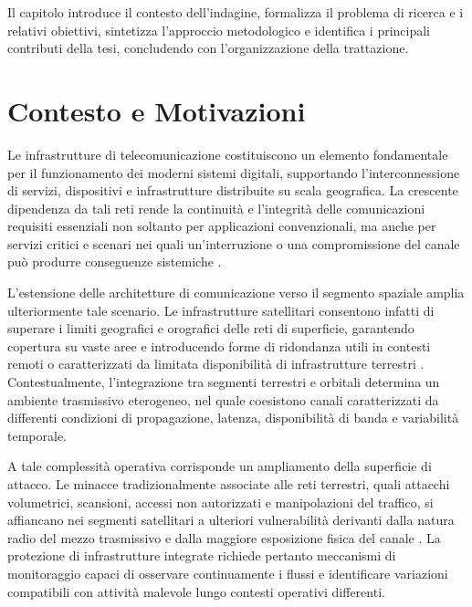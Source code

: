 Il capitolo introduce il contesto dell'indagine, formalizza il problema di ricerca e i relativi obiettivi, sintetizza l'approccio metodologico e identifica i principali contributi della tesi, concludendo con l'organizzazione della trattazione.


\section{Contesto e Motivazioni}
\label{sec:intro_contesto}

Le infrastrutture di telecomunicazione costituiscono un elemento fondamentale per il funzionamento dei moderni sistemi digitali, supportando l'interconnessione di servizi, dispositivi e infrastrutture distribuite su scala geografica. 
La crescente dipendenza da tali reti rende la continuità e l'integrità delle comunicazioni requisiti essenziali non soltanto per applicazioni convenzionali, ma anche per servizi critici e scenari nei quali un'interruzione o una compromissione del canale può produrre conseguenze sistemiche \cite{tanenbaum2020,stallings2020}.

L'estensione delle architetture di comunicazione verso il segmento spaziale amplia ulteriormente tale scenario. 
Le infrastrutture satellitari consentono infatti di superare i limiti geografici e orografici delle reti di superficie, garantendo copertura su vaste aree e introducendo forme di ridondanza utili in contesti remoti o caratterizzati da limitata disponibilità di infrastrutture terrestri \cite{kodheli2021}. 
Contestualmente, l'integrazione tra segmenti terrestri e orbitali determina un ambiente trasmissivo eterogeneo, nel quale coesistono canali caratterizzati da differenti condizioni di propagazione, latenza, disponibilità di banda e variabilità temporale.

A tale complessità operativa corrisponde un ampliamento della superficie di attacco. 
Le minacce tradizionalmente associate alle reti terrestri, quali attacchi volumetrici, scansioni, accessi non autorizzati e manipolazioni del traffico, si affiancano nei segmenti satellitari a ulteriori vulnerabilità derivanti dalla natura radio del mezzo trasmissivo e dalla maggiore esposizione fisica del canale \cite{nist2022}. 
La protezione di infrastrutture integrate richiede pertanto meccanismi di monitoraggio capaci di osservare continuamente i flussi e identificare variazioni compatibili con attività malevole lungo contesti operativi differenti.

